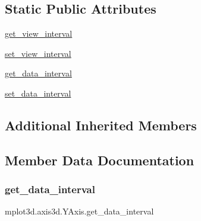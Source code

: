\subsection*{Static Public Attributes}
\begin{DoxyCompactItemize}
\item 
\hyperlink{classmplot3d_1_1axis3d_1_1YAxis_a4bbeb5a0d515c687727b9eecd73f53bc}{get\+\_\+view\+\_\+interval}
\item 
\hyperlink{classmplot3d_1_1axis3d_1_1YAxis_a6c710798967404340878e76f378d6f4f}{set\+\_\+view\+\_\+interval}
\item 
\hyperlink{classmplot3d_1_1axis3d_1_1YAxis_a2b6f7faa4a00db858b767dd6567bc2e9}{get\+\_\+data\+\_\+interval}
\item 
\hyperlink{classmplot3d_1_1axis3d_1_1YAxis_a7915d0da94514bdb734c707cb317b333}{set\+\_\+data\+\_\+interval}
\end{DoxyCompactItemize}
\subsection*{Additional Inherited Members}


\subsection{Member Data Documentation}
\mbox{\label{classmplot3d_1_1axis3d_1_1YAxis_a2b6f7faa4a00db858b767dd6567bc2e9}} 
\subsubsection{\texorpdfstring{get\+\_\+data\+\_\+interval}{get\_data\_interval}}
{\footnotesize\ttfamily mplot3d.\+axis3d.\+Y\+Axis.\+get\+\_\+data\+\_\+interval\hspace{0.3cm}{\ttfamily [static]}}

\mbox{\label{classmplot3d_1_1axis3d_1_1YAxis_a4bbeb5a0d515c687727b9eecd73f53bc}} 

